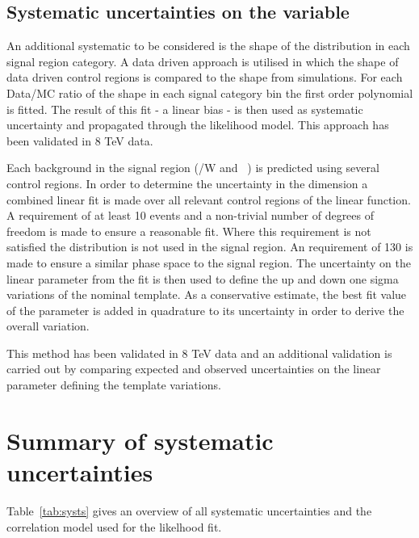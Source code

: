 \subsection{Systematic uncertainties on the \mht variable}

An additional systematic to be considered is the shape of the \mht distribution in each signal region category. 
A data driven approach is utilised in which the shape of data driven control regions is compared to the \mht shape from simulations.
For each Data/MC ratio of the shape in each signal category bin the first order polynomial is fitted. The result of this fit - a linear bias - 
is then used as systematic uncertainty and propagated through the likelihood model.
This approach has been validated in 8 TeV data. 

Each background in the signal region (\ttbar/W  and \zInv~) is predicted  using several control regions. 
In order to determine the uncertainty in the \mht dimension a combined linear fit is made over all relevant control regions
of the linear function. A requirement of at least 10 events and a non-trivial number of degrees of freedom
 is made to ensure a reasonable fit. Where this requirement is not satisfied the \mht distribution is not used in the signal region.
An \mht requirement of 130 \GeV is made to ensure a similar phase space to the signal region.
The uncertainty on the linear parameter from the fit is then used to define the up and down one sigma variations of the nominal template.
As a conservative estimate, the best fit value of the parameter is added in quadrature to its uncertainty in order to derive the overall variation.

This method has been validated in 8 TeV data and an additional validation is carried out by comparing expected and observed uncertainties
on the linear parameter defining the template variations.




\section{Summary of systematic uncertainties}

Table~\ref{tab:systs} gives an overview of all systematic uncertainties and the correlation model used for the likelhood fit. 


